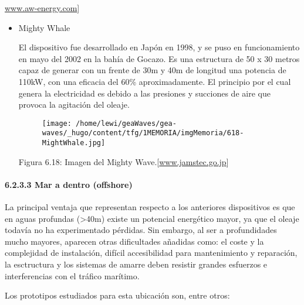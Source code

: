 \documentclass[]{article}
\let\oldparagraph\paragraph
\renewcommand{\paragraph}[1]{\oldparagraph{#1}\mbox{}}
\begin{document}
\href{http://www.aw-energy.com/}{www.aw-energy.com}{]}

\begin{itemize}
\item
  Mighty Whale

  El dispositivo fue desarrollado en Japón en 1998, y se puso en
  funcionamiento en mayo del 2002 en la bahía de Gocazo. Es una
  estructura de 50 x 30 metros capaz de generar con un frente de 30m y
  40m de longitud una potencia de 110kW, con una eficacia del 60\%
  aproximadamente. El principio por el cual genera la electricidad es
  debido a las presiones y succiones de aire que provoca la agitación
  del oleaje.

  \begin{figure}
  \centering
  \texttt{[image: /home/lewi/geaWaves/gea-waves/\_hugo/content/tfg/1MEMORIA/imgMemoria/618-MightWhale.jpg]}
  \caption{}
  \end{figure}

  Figura 6.18: Imagen del Mighty
  Wave.{[}\href{http://www.jamstec.go.jp/}{www.jamstec.go.jp}{]}
\end{itemize}

\paragraph{6.2.3.3 Mar a dentro (offshore)}\label{header-n279}

La principal ventaja que representan respecto a los anteriores
dispositivos es que en aguas profundas (\textgreater{}40m) existe un
potencial energético mayor, ya que el oleaje todavía no ha experimentado
pérdidas. Sin embargo, al ser a profundidades mucho mayores, aparecen
otras dificultades añadidas como: el coste y la complejidad de
instalación, difícil accesibilidad para mantenimiento y reparación, la
esctructura y los sistemas de amarre deben resistir grandes esfuerzos e
interferencias con el tráfico marítimo.

Los prototipos estudiados para esta ubicación son, entre otros:
\end{document}
